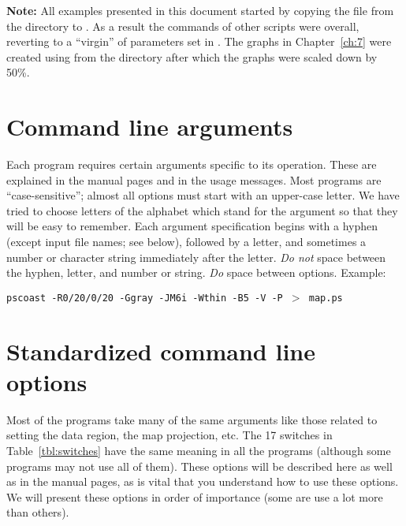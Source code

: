 
\textbf{Note:} All examples presented in this document started by copying the file
 from the directory  to .
As a result the commands  of other scripts were overall, reverting to a
``virgin'' of parameters set in . The graphs in Chapter~\ref{ch:7} were created
using  from the directory  after which the graphs were
scaled down by 50\%.


\section{Command line arguments} 
%
%

Each program requires certain arguments specific to its operation.
These are explained in the manual pages and in the usage messages.
Most programs are ``case-sensitive''; almost all options must start
with an upper-case letter.  We have tried to choose letters of the
alphabet which stand for the argument so that they will be easy to
remember.  Each argument specification begins with a hyphen
(except input file names; see below), followed by a letter, and
sometimes a number or character string immediately after the letter.
\emph{Do not} space between the hyphen, letter, and number or string.
\emph{Do} space between options.  Example:

\vspace{\baselineskip} 

\texttt{pscoast -R0/20/0/20 -Ggray -JM6i -Wthin -B5 -V -P $>$ map.ps}

\section{Standardized command line options} 
%
%
\label{sec:stopt}

Most of the programs take many of the same arguments like those
related to setting the data region, the map projection, etc.
The 17 switches in Table~\ref{tbl:switches} have the same meaning
in all the programs (although some programs may not use all of them).
These options will be described here as well as in the manual pages,
as is vital that you understand how to use these options.  We will present
these options in order of importance (some are use a lot more than others).


